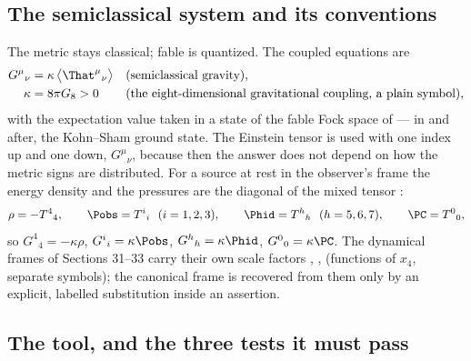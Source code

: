\subsection{The semiclassical system and its conventions}
\label{sec:4.1}

The metric stays classical; fable is quantized. The coupled equations are
\begin{align*}
  G^\mu{}_\nu&=\kappa\,\bigl\langle\That^\mu{}_\nu\bigr\rangle &&\text{(semiclassical gravity)},\\
  \kappa&=8\pi G_8>0 &&\text{(the eight-dimensional gravitational coupling, a plain symbol)},
\end{align*}
with the expectation value taken in a state of the fable Fock space of  --- in
 and after, the Kohn--Sham ground state. The Einstein tensor is used with one index up
and one down, $G^\mu{}_\nu$, because then the answer does not depend on how the metric signs are
distributed. For a source at rest in the observer's frame the energy density and the pressures are the
diagonal of the mixed tensor :
\[
  \rho=-T^4{}_4,\qquad \Pobs=T^i{}_i\ \ (i=1,2,3),\qquad \Phid=T^h{}_h\ \ (h=5,6,7),\qquad \PC=T^0{}_0 ,
\]
so $G^4{}_4=-\kappa\rho$, $G^i{}_i=\kappa\Pobs$, $G^h{}_h=\kappa\Phid$, $G^0{}_0=\kappa\PC$. The dynamical
frames of Sections 31--33 carry their own scale factors , , 
(functions of $x_4$, separate symbols); the canonical frame is recovered from them only by an explicit,
labelled substitution inside an assertion.

\subsection{The tool, and the three tests it must pass}
\label{sec:4.2}

